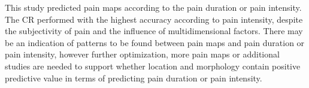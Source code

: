 This study predicted pain maps according to the pain duration or pain intensity.
The CR performed with the highest accuracy according to pain intensity, despite the subjectivity of pain and the influence of multidimensional factors.
There may be an indication of patterns to be found between pain maps and pain duration or pain intensity, however further optimization, more pain maps or additional studies are needed to support whether location and morphology contain positive predictive value in terms of predicting pain duration or pain intensity.




